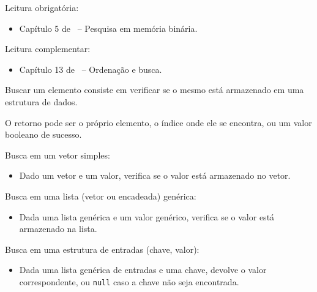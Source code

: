 \newcommand{\templatesdir}{../../../templates}
\newcommand{\template}{template-roteiro-est}


\newcommand{\content}{Busca em estruturas lineares}
\newcommand{\class}{Algoritmos e Estruturas de Dados}
\newcommand{\shortcourse}{45EST}



\makeheader

{
Leitura obrigatória:
\begin{itemize}
	\item Capítulo 5 de~\cite{Ziviani2010} -- Pesquisa em memória binária.
\end{itemize}

Leitura complementar:
\begin{itemize}
	\item Capítulo 13 de~\cite{Pereira2008} -- Ordenação e busca.
\end{itemize}
}

\medskip


\begin{itemize}
	\item Buscar um elemento consiste em verificar se o mesmo está armazenado em uma estrutura de dados.
	\item O retorno pode ser o próprio elemento, o índice onde ele se encontra, ou um valor booleano de sucesso.

	{\color{redtext}
	\item Busca em um vetor simples:
	\begin{itemize}
		\item Dado um vetor e um valor, verifica se o valor está armazenado no vetor.
	\end{itemize}
	\item Busca em uma lista (vetor ou encadeada) genérica:
	\begin{itemize}
		\item Dada uma lista genérica e um valor genérico, verifica se o valor está armazenado na lista.
	\end{itemize}
	\item Busca em uma estrutura de entradas (chave, valor):
	\begin{itemize}
		\item Dada uma lista genérica de entradas e uma chave, devolve o valor correspondente, ou \texttt{null} caso a chave não seja encontrada.
	\end{itemize}
	}
\end{itemize}

